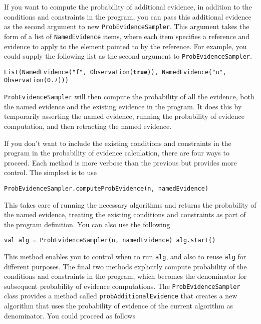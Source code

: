 If you want to compute the probability of additional evidence, in addition to the conditions and constraints in the program, you can pass this additional evidence as the second argument to new \texttt{ProbEvid\-enceSampler}. This argument takes the form of a list of \texttt{NamedEvidence} items, where each item specifies a reference and evidence to apply to the element pointed to by the reference. For example, you could supply the following list as the second argument to \texttt{ProbEvidenceSampler}.

\begin{flushleft}
\texttt{List(NamedEvidence("f", Observation(\textbf{true})), 
\newline NamedEvidence("u", Observation(0.7))) }
\end{flushleft}

\texttt{ProbEvidenceSampler} will then compute the probability of all the evidence, both the named evidence and the existing evidence in the program. It does this by temporarily asserting the named evidence, running the probability of evidence computation, and then retracting the named evidence.

If you don't want to include the existing conditions and constraints in the program in the probability of evidence calculation, there are four ways to proceed. Each method is more verbose than the previous but provides more control. The simplest is to use

\begin{flushleft}
\texttt{ProbEvidenceSampler.computeProbEvidence(n, namedEvidence)}
\end{flushleft}

This takes care of running the necessary algorithms and returns the probability of the named evidence, treating the existing conditions and constraints as part of the program definition. You can also use the following

\begin{flushleft}
\texttt{val alg = ProbEvidenceSampler(n, namedEvidence)
\newline alg.start()
}
\end{flushleft}

This method enables you to control when to run \texttt{alg}, and also to reuse \texttt{alg} for different purposes. The final two methods explicitly compute probability of the conditions and constraints in the program, which becomes the denominator for subsequent probability of evidence computations. The \texttt{ProbEvidenceSampler} class provides a method called \texttt{probAdditionalEvidence} that creates a new algorithm that uses the probability of evidence of the current algorithm as denominator. You could proceed as follows

